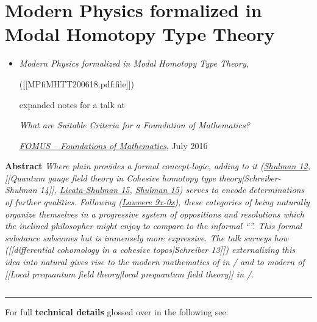 \documentclass[12pt,titlepage]{article}
\theoremstyle{plain}
\theoremstyle{definition}
\theoremstyle{remark}
\begin{document}


\section*{Modern Physics formalized in Modal Homotopy Type Theory}

\begin{itemize}%
\item {}

\emph{Modern Physics formalized in Modal Homotopy Type Theory},

 ([[MPfiMHTT200618.pdf:file]])

expanded notes for a talk at

\emph{What are Suitable Criteria for a Foundation of Mathematics?}

\emph{\href{http://fomus.weebly.com/}{FOMUS -- Foundations of Mathematics}}, July 2016



\end{itemize}
\textbf{Abstract} \emph{Where plain  provides a formal concept-logic, adding   to it (\href{modal+type+theory}{Shulman 12}, [[Quantum gauge field theory in Cohesive homotopy type theory|Schreiber-Shulman 14]], \hyperlink{LicataShulman}{Licata-Shulman 15}, \hyperlink{Shulman15}{Shulman 15}) serves to encode determinations of further qualities. Following (\href{cohesive+topos#References}{Lawvere 9x-0x}), these categories of being naturally organize themselves in a progressive system of oppositions and resolutions which the inclined philosopher might enjoy to compare to the informal ``''. This formal substance subsumes   but is immensely more expressive. The talk surveys how ([[differential cohomology in a cohesive topos|Schreiber 13]]) externalizing this idea into natural  gives rise to the modern mathematics of  in / and to modern  of [[Local prequantum field theory|local prequantum field theory]] in /.}

$\,$


\vspace{.5em} \hrule \vspace{.5em}
For full \textbf{technical details} glossed over in the following see:
\end{document}
